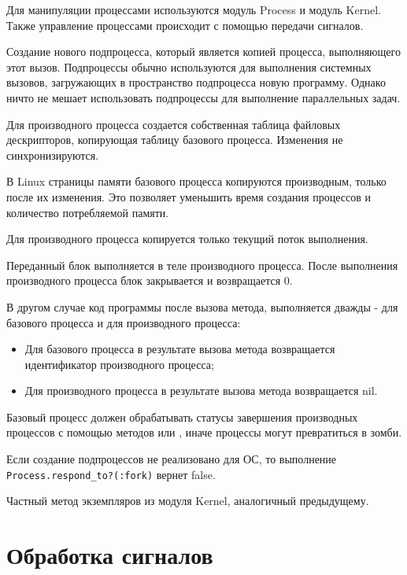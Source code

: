 Для манипуляции процессами используются модуль Process и модуль Kernel. Также управление процессами происходит с помощью передачи сигналов.

\begin{methodlist}
  Создание нового подпроцесса, который является копией процесса, выполняющего этот вызов. Подпроцессы обычно используются для выполнения системных вызовов, загружающих в пространство подпроцесса новую программу. Однако ничто не мешает использовать подпроцессы для выполнение параллельных задач.

  Для производного процесса создается собственная таблица файловых дескрипторов, копирующая таблицу базового процесса. Изменения не синхронизируются.

  В Linux страницы памяти базового процесса копируются производным, только после их изменения. Это позволяет уменьшить время создания процессов и количество потребляемой памяти.

  Для производного процесса копируется только текущий поток выполнения.

  Переданный блок выполняется в теле производного процесса. После выполнения производного процесса блок закрывается и возвращается 0.

  В другом случае код программы после вызова метода, выполняется дважды - для базового процесса и для производного процесса:

  \begin{itemize}
    \item Для базового процесса в результате вызова метода возвращается идентификатор производного процесса;
    \item Для производного процесса в результате вызова метода возвращается nil.
  \end{itemize}

  Базовый процесс должен обрабатывать статусы завершения производных процессов с помощью методов  или , иначе процессы могут превратиться в зомби.

  Если создание подпроцессов не реализовано для ОС, то выполнение \verb!Process.respond_to?(:fork)! вернет false.

  Частный метод экземпляров из модуля Kernel, аналогичный предыдущему.
\end{methodlist}

\section{Обработка сигналов}


